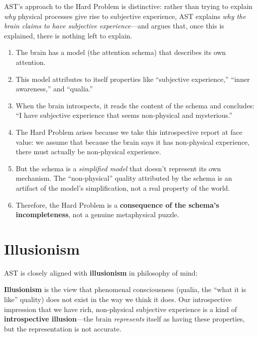 \documentclass[11pt,a4paper]{report}
\begin{document}
AST's approach to the Hard Problem is distinctive: rather than trying to explain \emph{why} physical processes give rise to subjective experience, AST explains \emph{why the brain claims to have subjective experience}---and argues that, once this is explained, there is nothing left to explain.

\begin{principlebox}
\begin{enumerate}[leftmargin=1.5em]
  \item The brain has a model (the attention schema) that describes its own attention.
  \item This model attributes to itself properties like ``subjective experience,'' ``inner awareness,'' and ``qualia.''
  \item When the brain introspects, it reads the content of the schema and concludes: ``I have subjective experience that seems non-physical and mysterious.''
  \item The Hard Problem arises because we take this introspective report at face value: we assume that because the brain says it has non-physical experience, there must actually be non-physical experience.
  \item But the schema is a \emph{simplified model} that doesn't represent its own mechanism. The ``non-physical'' quality attributed by the schema is an artifact of the model's simplification, not a real property of the world.
  \item Therefore, the Hard Problem is a \textbf{consequence of the schema's incompleteness}, not a genuine metaphysical puzzle.
\end{enumerate}
\end{principlebox}

\section{Illusionism}

AST is closely aligned with \textbf{illusionism} in philosophy of mind:

\begin{definitionbox}
\textbf{Illusionism} is the view that phenomenal consciousness (qualia, the ``what it is like'' quality) does not exist in the way we think it does. Our introspective impression that we have rich, non-physical subjective experience is a kind of \textbf{introspective illusion}---the brain \emph{represents} itself as having these properties, but the representation is not accurate.
\end{definitionbox}
\end{document}

